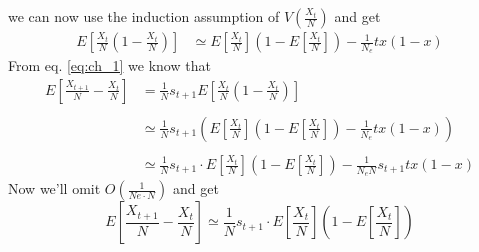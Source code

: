 \documentclass[11pt]{article}
\begin{document}
we can now use the induction assumption of $V(\frac{X_t}{N})$ and get
\begin{equation}
\begin{split}
E\left[\frac{X_t}{N}\left(1-\frac{X_t}{N}\right)\right] &\simeq
E\left[\frac{X_t}{N}\right]\left(1-E\left[\frac{X_t}{N}\right]\right)-\frac{1}{N_e}tx(1-x)
\end{split}
\end{equation}
From eq. \ref{eq:ch_1} we know that
\begin{equation}
\begin{split}
E\left[\frac{X_{t+1}}{N}-\frac{X_t}{N}\right] &= \frac{1}{N}s_{t+1}E\left[\frac{X_t}{N}\left(1-\frac{X_t}{N}\right)\right] \\\\
&\simeq \frac{1}{N}s_{t+1}\left(E\left[\frac{X_t}{N}\right]\left(1-E\left[\frac{X_t}{N}\right]\right) - \frac{1}{N_e}tx(1-x)\right) \\\\
&\simeq \frac{1}{N}s_{t+1}\cdot E\left[\frac{X_t}{N}\right]\left(1-E\left[\frac{X_t}{N}\right]\right) - \frac{1}{N_e N}s_{t+1}tx(1-x)
\end{split}
\end{equation}
Now we'll omit $O(\frac{1}{Ne\cdot N})$ and get
\begin{equation}\label{eq:ch_2}
E\left[\frac{X_{t+1}}{N}-\frac{X_t}{N}\right] \simeq \frac{1}{N}s_{t+1}\cdot E\left[\frac{X_t}{N}\right]\left(1-E\left[\frac{X_t}{N}\right]\right)
\end{equation}
\end{document}
